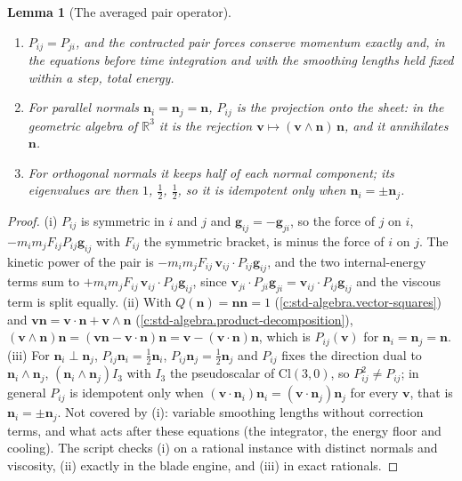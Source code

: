 \documentclass[11pt]{article}
\newtheorem{lemma}[theorem]{Lemma}
\theoremstyle{definition}
\theoremstyle{plain}
\newcommand{\changedmark}[2]{\marginpar{\raggedright\scriptsize\color{#1}#2}}
\providecommand{\Cl}{}\renewcommand{\Cl}{\mathrm{Cl}}
\begin{document}
\begin{lemma}[The averaged pair operator]\label{c:simulations.averaged-pair-operator}
\changedmark{BurntOrange}{changed since the deposit}
\begin{enumerate}
\item[(i)] $P_{ij} = P_{ji}$, and the contracted pair forces conserve momentum exactly and, in the equations before time integration and with the smoothing lengths held fixed within a step, total energy.
\item[(ii)] For parallel normals $\mathbf{n}_{i} = \mathbf{n}_{j} = \mathbf{n}$, $P_{ij}$ is the projection onto the sheet: in the geometric algebra of $\mathbb{R}^{3}$ it is the rejection $\mathbf{v} \mapsto (\mathbf{v}\wedge\mathbf{n})\,\mathbf{n}$, and it annihilates $\mathbf{n}$.
\item[(iii)] For orthogonal normals it keeps half of each normal component; its eigenvalues are then $1$, $\tfrac{1}{2}$, $\tfrac{1}{2}$, so it is idempotent only when $\mathbf{n}_{i} = \pm\mathbf{n}_{j}$.
\end{enumerate}
\end{lemma}
\begin{proof}
(i) $P_{ij}$ is symmetric in $i$ and $j$ and $\mathbf{g}_{ij} = -\mathbf{g}_{ji}$, so the force of $j$ on $i$, $-m_{i}m_{j}F_{ij}P_{ij}\mathbf{g}_{ij}$ with $F_{ij}$ the symmetric bracket, is minus the force of $i$ on $j$. The kinetic power of the pair is $-m_{i}m_{j}F_{ij}\,\mathbf{v}_{ij}\cdot P_{ij}\mathbf{g}_{ij}$, and the two internal-energy terms sum to $+m_{i}m_{j}F_{ij}\,\mathbf{v}_{ij}\cdot P_{ij}\mathbf{g}_{ij}$, since $\mathbf{v}_{ji}\cdot P_{ji}\mathbf{g}_{ji} = \mathbf{v}_{ij}\cdot P_{ij}\mathbf{g}_{ij}$ and the viscous term is split equally. (ii) With $Q(\mathbf{n}) = \mathbf{n}\mathbf{n} = 1$ (\ref{c:std-algebra.vector-squares}) and $\mathbf{v}\mathbf{n} = \mathbf{v}\cdot\mathbf{n} + \mathbf{v}\wedge\mathbf{n}$ (\ref{c:std-algebra.product-decomposition}), $(\mathbf{v}\wedge\mathbf{n})\mathbf{n} = (\mathbf{v}\mathbf{n} - \mathbf{v}\cdot\mathbf{n})\mathbf{n} = \mathbf{v} - (\mathbf{v}\cdot\mathbf{n})\mathbf{n}$, which is $P_{ij}(\mathbf{v})$ for $\mathbf{n}_{i} = \mathbf{n}_{j} = \mathbf{n}$. (iii) For $\mathbf{n}_{i}\perp\mathbf{n}_{j}$, $P_{ij}\mathbf{n}_{i} = \tfrac{1}{2}\mathbf{n}_{i}$, $P_{ij}\mathbf{n}_{j} = \tfrac{1}{2}\mathbf{n}_{j}$ and $P_{ij}$ fixes the direction dual to $\mathbf{n}_{i}\wedge\mathbf{n}_{j}$, $(\mathbf{n}_{i}\wedge\mathbf{n}_{j})I_{3}$ with $I_{3}$ the pseudoscalar of $\Cl(3,0)$, so $P_{ij}^{2} \ne P_{ij}$; in general $P_{ij}$ is idempotent only when $(\mathbf{v}\cdot\mathbf{n}_{i})\mathbf{n}_{i} = (\mathbf{v}\cdot\mathbf{n}_{j})\mathbf{n}_{j}$ for every $\mathbf{v}$, that is $\mathbf{n}_{i} = \pm\mathbf{n}_{j}$. Not covered by (i): variable smoothing lengths without correction terms, and what acts after these equations (the integrator, the energy floor and cooling). The script checks (i) on a rational instance with distinct normals and viscosity, (ii) exactly in the blade engine, and (iii) in exact rationals.

\end{proof}
\end{document}
